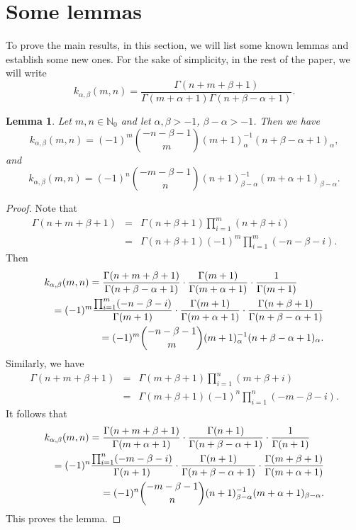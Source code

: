 \documentclass[10pt]{amsart}
\newtheorem{lemma}[theorem]{Lemma}
\theoremstyle{definition}
\theoremstyle{question}
\numberwithin{equation}{section}
\begin{document}
\section{{\bf Some lemmas}}
To prove the main results, in this section, we will list some known lemmas and establish some new ones. 
For the sake of simplicity, in the rest of the paper, we will write 
$$k_{\alpha,\beta}(m,n)=\frac{\Gamma(n+m+\beta+1)}{\Gamma(m+\alpha+1)\Gamma(n+\beta-\alpha+1)}.$$
\begin{lemma}\label{l-1}
Let $m, n \in \mathbb{N}_0$ and let $\alpha, \beta>-1$, $\beta-\alpha>-1$. Then we have
$$k_{\alpha,\beta}(m,n)=(-1)^m \binom{-n-\beta-1}{m}(m+1)_{\alpha}^{-1}(n+\beta-\alpha+1)_{\alpha},$$
and 
$$k_{\alpha,\beta}(m,n)=(-1)^n \binom{-m-\beta-1}{n}(n+1)_{\beta-\alpha}^{-1}(m+\alpha+1)_{\beta-\alpha}.$$
\end{lemma}
\begin{proof}
Note that \begin{eqnarray}\Gamma(n+m+\beta+1)&=&\Gamma(n+\beta+1)\prod_{i=1}^{m}(n+\beta+i)\nonumber \\
&=& \Gamma(n+\beta+1)(-1)^m\prod_{i=1}^{m}(-n-\beta-i). \nonumber\end{eqnarray}
Then
\begin{eqnarray}\lefteqn{k_{\alpha,\beta}(m,n)=\frac{\Gamma(n+m+\beta+1)}{\Gamma(n+\beta-\alpha+1)}\cdot\frac{\Gamma(m+1)}{\Gamma(m+\alpha+1)}\cdot\frac{1}{\Gamma(m+1)}}\nonumber \\
&&= (-1)^m \frac{\prod_{i=1}^{m}(-n-\beta-i)}{\Gamma(m+1)}\cdot\frac{\Gamma(m+1)}{ \Gamma(m+\alpha+1)}\cdot\frac{\Gamma(n+\beta+1)}{\Gamma(n+\beta-\alpha+1)} \nonumber \\
&&=(-1)^m \binom{-n-\beta-1}{m}(m+1)_{\alpha}^{-1}(n+\beta-\alpha+1)_{\alpha}. \nonumber
\end{eqnarray}
Similarly, we have \begin{eqnarray}\Gamma(n+m+\beta+1)&=&\Gamma(m+\beta+1)\prod_{i=1}^{n}(m+\beta+i)\nonumber \\
&=& \Gamma(m+\beta+1)(-1)^n \prod_{i=1}^{n}(-m-\beta-i). \nonumber  \end{eqnarray}
It follows that
\begin{eqnarray}\lefteqn{k_{\alpha,\beta}(m,n)=\frac{\Gamma(n+m+\beta+1)}{\Gamma(m+\alpha+1)}\cdot\frac{\Gamma(n+1)}{ \Gamma(n+\beta-\alpha+1)}\cdot\frac{1}{\Gamma(n+1)}} \nonumber \\
&&= (-1)^n \frac{\prod_{i=1}^{n}(-m-\beta-i)}{\Gamma(n+1)}\cdot\frac{\Gamma(n+1)}{ \Gamma(n+\beta-\alpha+1)}\cdot\frac{\Gamma(m+\beta+1)}{\Gamma(m+\alpha+1)} \nonumber \\
&&=(-1)^n \binom{-m-\beta-1}{n}(n+1)_{\beta-\alpha}^{-1}(m+\alpha+1)_{\beta-\alpha}. \nonumber
\end{eqnarray}
This proves the lemma.
\end{proof}
\end{document}
